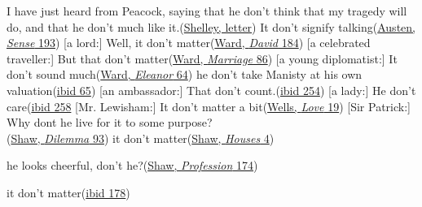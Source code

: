 \ea \label{ex:11-185}
\ea
I have just heard from Peacock, saying that he don't think that my tragedy will do, and that he don't much like it.\hfill(\href{https://archive.org/details/worksinversepros08sheluoft/page/132/mode/2up?q=%22have+just+heard+from+Peacock%22&view=theater}{Shelley, letter})
\ex
It don't signify talking\hfill(\href{https://archive.org/details/sensesensibility00austrich/page/166/mode/2up?q=%22signify+talking%22&view=theater}{Austen, \textit{Sense} 193})
\ex
{}[a lord:] Well, it don't matter\hfill(\href{https://archive.org/details/historydavidgri02wardgoog/page/258/mode/2up?q=%22Well%2C+it+don%27t+matter%22&view=theater}{Ward, \textit{David} 184}) %
\ex
{}[a celebrated traveller:] But that don't matter\hfill(\href{https://archive.org/details/marriageofwillia0000mrsh_i0u5/page/96/mode/2up?q=%22that+don%27t+matter%22&view=theater}{Ward, \textit{Marriage} 86}) %
\ex
{}[a young diplomatist:] It don't sound much\hfill(\href{https://archive.org/details/cu31924013567130/page/80/mode/2up?q=%22it+don%27t+sound+much%22&view=theater}{Ward, \textit{Eleanor} 64})
\ex
he don't take Manisty at his own valuation\hfill(\href{https://archive.org/details/cu31924013567130/page/82/mode/2up?q=%22he+don%27t+take+manisty%22&view=theater}{ibid 65})
\ex
{}[an ambassador:]  That don't count.\hfill(\href{https://archive.org/details/cu31924013567130/page/316/mode/2up?q=%22that+don%27t+count%22&view=theater}{ibid 254})
\ex
{}[a lady:] He don't care\hfill(\href{https://archive.org/details/cu31924013567130/page/322/mode/2up?q=%22don%27t+care%22&view=theater}{ibid 258}
\ex
{}[Mr. Lewisham:] It don't matter a bit\hfill(\href{https://archive.org/details/loveandmrlewisha00welluoft/page/n27/mode/2up?q=%22matter+a+bit%22&view=theater}{Wells, \textit{Love} 19})
\ex
{}[Sir Patrick:] Why dont he live for it to some purpose?\\\hfill(\href{https://archive.org/details/doctorsdilemmatr00shawuoft/page/92/mode/2up?q=%22he+live+for+it%22&view=theater}{Shaw, \textit{Dilemma} 93})
\ex
it don't matter\hfill(\href{https://archive.org/details/playspleasantunp01shaw/page/4/mode/2up?q=don%27t&view=theater}{Shaw, \textit{Houses} 4})

\ex
he looks cheerful, don't he?\hfill(\href{https://archive.org/details/playspleasantunp01shaw/page/174/mode/2up?q=don%27t&view=theater}{Shaw, \textit{Profession} 174})

\ex
it don't matter\hfill(\href{https://archive.org/details/playspleasantunp01shaw/page/180/mode/2up?q=don%27t&view=theater}{ibid 178})

